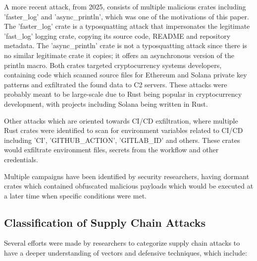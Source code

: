 A more recent attack, from 2025, consists of multiple malicious crates including 'faster\_log' and 'async\_println', which was one of the motivations of this paper. The 'faster\_log' crate is a typosquatting attack that impersonates the legitimate 'fast\_log' logging crate, copying its source code, README and repository metadata. The 'async\_println' crate is not a typosquatting attack since there is no similar legitimate crate it copies; it offers an asynchronous version of the println macro. Both crates targeted cryptocurrency systems developers, containing code which scanned source files for Ethereum and Solana private key patterns and exfiltrated the found data to C2 servers. These attacks were probably meant to be large-scale due to Rust being popular in cryptocurrency development, with projects including Solana being written in Rust.

Other attacks which are oriented towards CI/CD exfiltration, where multiple Rust crates were identified to scan for environment variables related to CI/CD including 'CI', 'GITHUB\_ACTION', 'GITLAB\_ID' and others. These crates would exfiltrate environment files, secrets from the workflow and other credentials.

Multiple campaigns have been identified by security researchers, having dormant crates which contained obfuscated malicious payloads which would be executed at a later time when specific conditions were met.

\subsection{Classification of Supply Chain Attacks}\label{sect:classification-attacks}

Several efforts were made by researchers to categorize supply chain attacks to have a deeper understanding of vectors and defensive techniques, which include:

